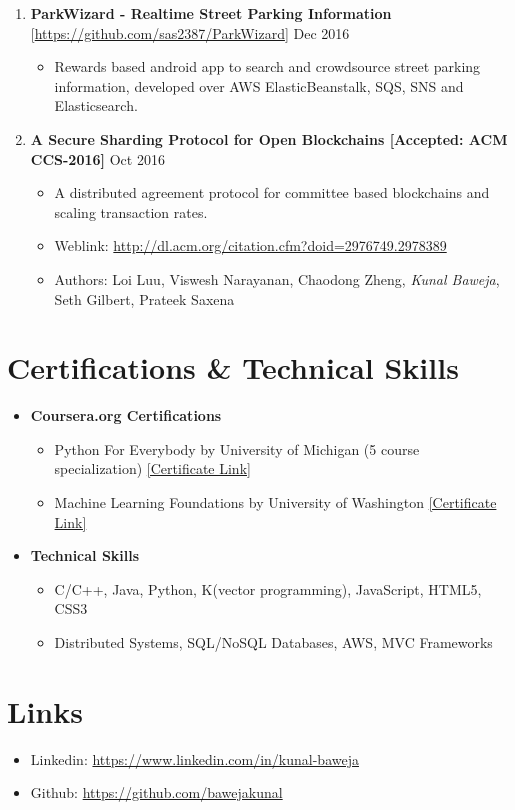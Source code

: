 \documentclass{article}
\newcommand{\bi}{\vspace{-1mm}\begin{itemize}[align=left,leftmargin=*, rightmargin=80pt, labelindent=0pt,labelsep=2pt, label={-}, nosep]}
\newcommand{\ei}{\end{itemize}}
\begin{document}
\begin{enumerate}
    \item \textbf{ParkWizard - Realtime Street Parking Information} [\href{https://github.com/sas2387/ParkWizard}{https://github.com/sas2387/ParkWizard}] {\hfill Dec 2016}
    \bi
        \item Rewards based android app to search and crowdsource street parking information, developed over AWS ElasticBeanstalk, SQS, SNS and Elasticsearch.
    \ei

    \item \textbf{A Secure Sharding Protocol for Open Blockchains [Accepted: ACM CCS-2016]} {\hfill Oct 2016}
    \bi

        \item A distributed agreement protocol for committee based blockchains and scaling transaction rates.

        \item Weblink: \href{http://dl.acm.org/citation.cfm?doid=2976749.2978389}{http://dl.acm.org/citation.cfm?doid=2976749.2978389}
        
        \item Authors: Loi Luu, Viswesh Narayanan, Chaodong Zheng, \textit{Kunal Baweja}, Seth Gilbert, Prateek Saxena
    \ei

\end{enumerate}

\vspace{-2mm}
\section*{Certifications \& Technical Skills}
\begin{itemize}
    \item \textbf{Coursera.org Certifications}
    \bi
        \item Python For Everybody by University of Michigan (5 course specialization) \href{https://www.coursera.org/account/accomplishments/specialization/2B5PCJGZ9WEE}{[Certificate Link]}

        \item Machine Learning Foundations by University of Washington \href{https://www.coursera.org/account/accomplishments/certificate/NDVXWMCYKX9N}{[Certificate Link]}
    \ei

    \item \textbf{Technical Skills}
    \bi
        \item C/C++, Java, Python, K(vector programming), JavaScript, HTML5, CSS3
        \item Distributed Systems, SQL/NoSQL Databases, AWS, MVC Frameworks
    \ei
\end{itemize}

\vspace{-2mm}
\section*{Links}
\begin{itemize}[nosep]
    \item Linkedin: \href{https://www.linkedin.com/in/kunal-baweja}{https://www.linkedin.com/in/kunal-baweja}
    \item Github: \href{https://github.com/bawejakunal}{https://github.com/bawejakunal}
\end{itemize}
\end{document}
